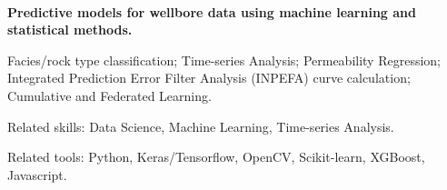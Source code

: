\\
\vspace{-.2em}
\begin{xitemize}
    \item \textbf{Predictive models for wellbore data using machine learning and statistical methods.}
    \begin{zitemize}
        \item Facies/rock type classification; Time-series Analysis; Permeability Regression; Integrated Prediction Error Filter Analysis (INPEFA) curve calculation; Cumulative and Federated Learning.
        \item Related skills: Data Science, Machine Learning, Time-series Analysis.
        \item Related tools: Python, Keras/Tensorflow, OpenCV, Scikit-learn, XGBoost, Javascript.
    \end{zitemize}
\end{xitemize}